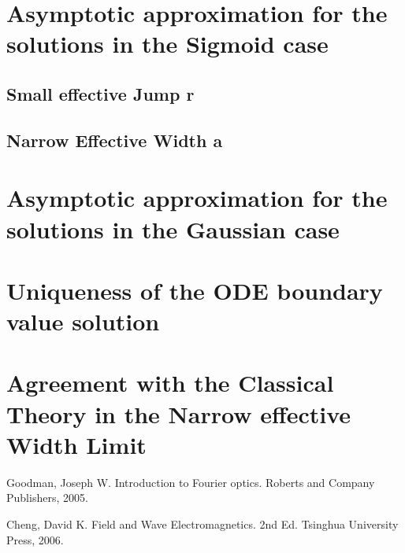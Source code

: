\documentclass[twocolumn,secnumarabic,amssymb, nobibnotes, aps, prd]{revtex4-1}
\begin{document}
 

\section{Asymptotic approximation for the solutions in the Sigmoid case}

\subsection{Small effective Jump r}

\subsection{Narrow Effective Width a}

\section{Asymptotic approximation for the solutions in the Gaussian case}

\section{Uniqueness of the ODE boundary value solution}


\section{Agreement with the Classical Theory in the Narrow effective Width Limit}


%

\begin{thebibliography}{2d}

Goodman, Joseph W. Introduction to Fourier optics. Roberts and Company Publishers, 2005.

Cheng, David K. Field and Wave Electromagnetics. 2nd Ed. Tsinghua University Press, 2006.



  


\end{thebibliography}


%	
%
%
%

%
%
%
\end{document}
